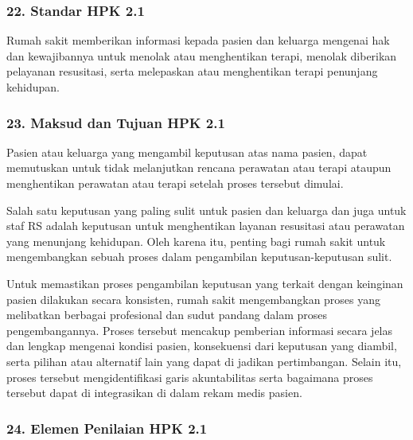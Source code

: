 \documentclass[
]{book}
\begin{document}
\hypertarget{standar-hpk-2.1}{%
\subsubsection*{22. Standar HPK 2.1}\label{standar-hpk-2.1}}

Rumah sakit memberikan informasi kepada pasien dan keluarga mengenai hak dan kewajibannya untuk menolak atau menghentikan terapi, menolak diberikan pelayanan resusitasi, serta melepaskan atau menghentikan terapi penunjang kehidupan.

\hypertarget{maksud-dan-tujuan-hpk-2.1}{%
\subsubsection*{23. Maksud dan Tujuan HPK 2.1}\label{maksud-dan-tujuan-hpk-2.1}}

Pasien atau keluarga yang mengambil keputusan atas nama pasien, dapat memutuskan untuk tidak melanjutkan rencana perawatan atau terapi ataupun menghentikan perawatan atau terapi setelah proses tersebut dimulai.

Salah satu keputusan yang paling sulit untuk pasien dan keluarga dan juga untuk staf RS adalah keputusan untuk menghentikan layanan resusitasi atau perawatan yang menunjang kehidupan. Oleh karena itu, penting bagi rumah sakit untuk mengembangkan sebuah proses dalam pengambilan keputusan-keputusan sulit.

Untuk memastikan proses pengambilan keputusan yang terkait dengan keinginan pasien dilakukan secara konsisten, rumah sakit mengembangkan proses yang melibatkan berbagai profesional dan sudut pandang dalam proses pengembangannya. Proses tersebut mencakup pemberian informasi secara jelas dan lengkap mengenai kondisi pasien, konsekuensi dari keputusan yang diambil, serta pilihan atau alternatif lain yang dapat di jadikan pertimbangan. Selain itu, proses tersebut mengidentifikasi garis akuntabilitas serta bagaimana proses tersebut dapat di integrasikan di dalam rekam medis pasien.

\hypertarget{elemen-penilaian-hpk-2.1}{%
\subsubsection*{24. Elemen Penilaian HPK 2.1}\label{elemen-penilaian-hpk-2.1}}
\end{document}
